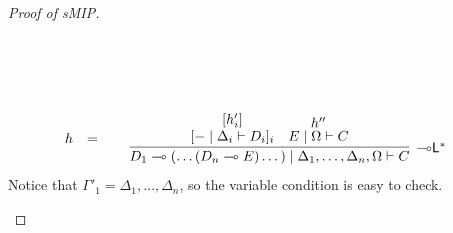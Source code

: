 \documentclass[sn-mathphys-num]{sn-jnl}%
\newcommand{\GG}{\Gamma}
\newcommand{\GD}{\Delta}
\newcommand{\GO}{\Omega}
\newcommand{\vd}{\vdash}
\newcommand{\lolli}{\multimap}
\newcommand{\lleft}{{\lolli}\mathsf{L}}
\newcommand{\lright}{{\lolli}\mathsf{R}}
\newcommand{\proofbox}[1]{\begin{tabular}{l} #1 \end{tabular}}
\newcommand{\sMIP}{\textsf{sMIP}}
\theoremstyle{thmstyleone}%
\theoremstyle{thmstyletwo}%
\theoremstyle{thmstylethree}%
\begin{document}
\begin{proof}[Proof of \sMIP]
\begin{itemize}
\begin{displaymath}
\begin{array}{rcl}
{{{        }
        }
        }
        \\[1.5cm]
        h
        &=&
        \proofbox{
        \infer[\lleft^*]{D_1 \lolli (\dots (D_n \lolli E)\dots) \mid \GD_1, \dots, \GD_n, \GO \vd C}{
        \deduce{[{-} \mid \GD_i \vd D_i]_i}{[h'_i]}
        &
        \deduce{E \mid \GO \vd C}{h''}
        }
        }
      \end{array}
    \end{displaymath}
    Notice that $\GG'_1 = \GD_1, \dots, \GD_n$, so the variable condition is easy to check.
  \end{itemize}
\end{proof}
\end{document}
